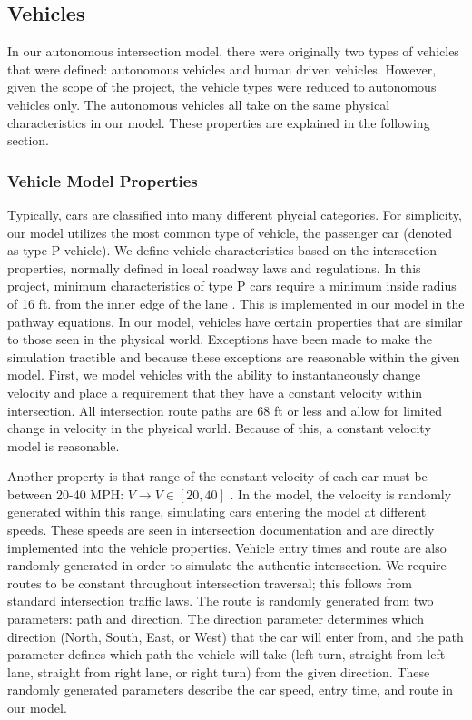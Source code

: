 \subsection{Vehicles}

In our autonomous intersection model, there were originally two types of vehicles that were defined: autonomous vehicles and human driven vehicles.  However, given the scope of the project, the vehicle types were reduced to autonomous vehicles only. The autonomous vehicles all take on the same physical characteristics in our model. These properties are explained in the following section.

\subsubsection{Vehicle Model Properties}

Typically, cars are classified into many different phycial categories.  For simplicity, our model utilizes the most common type of vehicle, the passenger car (denoted as type P vehicle).  We define vehicle characteristics based on the intersection properties, normally defined in local roadway laws and regulations.  In this project, minimum characteristics of type P cars require a minimum inside radius of 16 ft. from the inner edge of the lane \cite{Bureau}.  This is implemented in our model in the pathway equations.  In our model, vehicles have certain properties that are similar to those seen in the physical world.  Exceptions have been made to make the simulation tractible and because these exceptions are reasonable within the given model.  First, we model vehicles with the ability to instantaneously change velocity and place a requirement that they have a constant velocity within intersection.  All intersection route paths are 68 ft or less and allow for limited change in velocity in the physical world.  Because of this, a constant velocity model is reasonable.

Another property is that range of the constant velocity of each car must be between 20-40 MPH: $V \rightarrow V \in [20,40]$ \cite{Motorists}.  In the model, the velocity is randomly generated within this range, simulating cars entering the model at different speeds.  These speeds are seen in intersection documentation and are directly implemented into the vehicle properties. Vehicle entry times and route are also randomly generated in order to simulate the authentic intersection.  We require routes to be constant throughout intersection traversal; this follows from standard intersection traffic laws.  The route is randomly generated from two parameters: path and direction.  The direction parameter determines which direction (North, South, East, or West) that the car will enter from, and the path parameter defines which path the vehicle will take (left turn, straight from left lane, straight from right lane, or right turn) from the given direction.  These randomly generated parameters describe the car speed, entry time, and route in our model.

